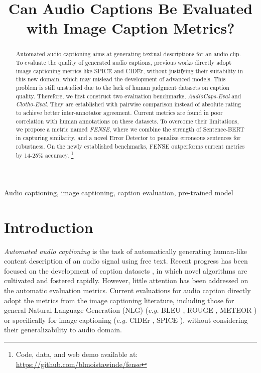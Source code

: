 \documentclass{article}
\title{Can Audio Captions Be Evaluated with Image Caption Metrics?}
\begin{document}
\ninept
%
\maketitle
%
\begin{abstract}
Automated audio captioning aims at generating textual descriptions for an audio clip. To evaluate the quality of generated audio captions, previous works directly adopt image captioning metrics like SPICE and CIDEr, without justifying their suitability in this new domain, which may mislead the development of advanced models. This problem is still unstudied due to the lack of human judgment datasets on caption quality. Therefore, we first construct two evaluation benchmarks, \textit{AudioCaps-Eval} and \textit{Clotho-Eval}. They are established with pairwise comparison instead of absolute rating to achieve better inter-annotator agreement. Current metrics are found in poor correlation with human annotations on these datasets. To overcome their limitations, we propose a metric named \textit{FENSE}, where we combine the strength of Sentence-BERT in capturing similarity, and a novel Error Detector to penalize erroneous sentences for robustness. On the newly established benchmarks, FENSE outperforms current metrics by 14-25\% accuracy. 
\footnote{Code, data, and web demo available at: \url{https://github.com/blmoistawinde/fense}}
\end{abstract}
%
\begin{keywords}
Audio captioning, image captioning, caption evaluation, pre-trained model
\end{keywords}
%
\section{Introduction}
\label{sec:intro}
\textit{Automated audio captioning} \cite{drossos2017automated} is the task of automatically generating human-like content description of an audio signal using free text. Recent progress has been focused on the development of caption datasets \cite{drossos2020clotho, wu2019audio, kim2019audiocaps}, in which novel algorithms \cite{xu2021sjtu, mei2021encoder, xu2020crnn} are cultivated and fostered rapidly. However, little attention has been addressed on the automatic evaluation metrics. Current evaluations for audio caption directly adopt the metrics from the image captioning literature, including those for general Natural Language Generation (NLG) (\textit{e.g.} BLEU \cite{papineni2002bleu}, ROUGE \cite{lin2004rouge}, METEOR \cite{banerjee2005meteor}) or specifically for image captioning  (\textit{e.g.} CIDEr \cite{vedantam2015cider}, SPICE \cite{anderson2016spice}), without considering their generalizability to audio domain.
\end{document}

